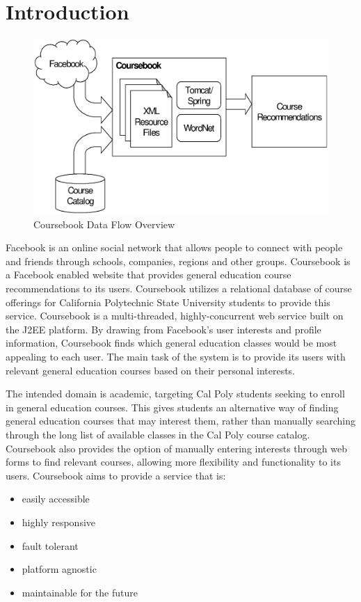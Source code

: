\chapter{Introduction}

\begin{figure}[t]
  \begin{center}
  \includegraphics[width=\textwidth]{images/overview}
  \caption{Coursebook Data Flow Overview}
  \label{fig:overview}
  \end{center}
\end{figure}

Facebook is an online social network that allows people to connect with people 
and friends through schools, companies, regions and other groups. Coursebook is
a Facebook enabled website that provides general education course 
recommendations to its users. Coursebook utilizes a relational database of 
course offerings for California Polytechnic State University students to provide
this service. Coursebook is a multi-threaded, highly-concurrent web service 
built on the J2EE platform. By drawing from Facebook's user interests and 
profile information, Coursebook finds which general education classes would be
most appealing to each user. The main task of the system is to provide its users
with relevant general education courses based on their personal interests.

The intended domain is academic, targeting Cal Poly students seeking to enroll 
in general education courses. This gives students an alternative way of finding
general education courses that may interest them, rather than manually searching
through the long list of available classes in the Cal Poly course catalog. 
Coursebook also provides the option of manually entering interests through web
forms to find relevant courses, allowing more flexibility and functionality to
its users. Coursebook aims to provide a service that is:

\singlespacing
\begin{itemize}
  \item easily accessible
  \item highly responsive
  \item fault tolerant
  \item platform agnostic
  \item maintainable for the future
\end{itemize}
\doublespacing


